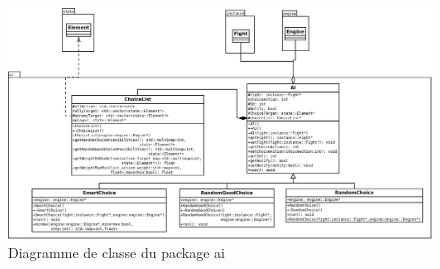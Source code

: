 \documentclass[12pt,a4paper]{report}
\begin{document}
\begin{figure}
\caption{Diagramme de classe du package ai}
\includegraphics[width=1\textwidth]{ai.jpeg}
\end{figure}
\end{document}
